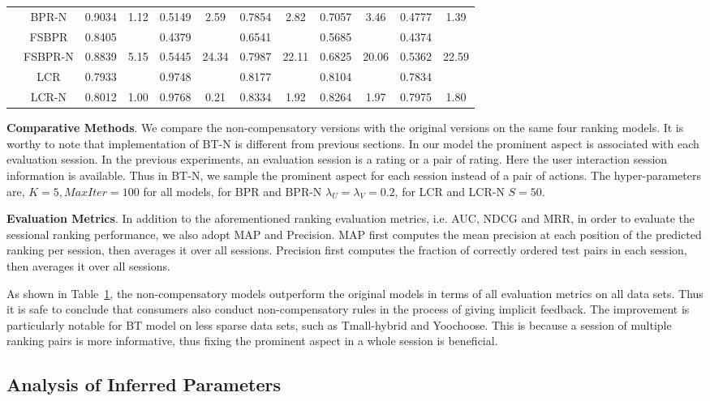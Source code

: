 \documentclass[letterpaper]{article} %
\begin{document}
\begin{table}[ht]
\begin{center}
\begin{tabular}{c|c |cc |cc |cc|cc|cc}
&BPR-N &0.9034 &1.12 &0.5149 & 2.59 &0.7854 &2.82 &0.7057 & 3.46 &0.4777  &1.39 \\
&FSBPR &0.8405& &0.4379 && 0.6541& &0.5685& & 0.4374 &\\ 
&FSBPR-N &0.8839 &5.15 & 0.5445 &24.34 &0.7987 &22.11 &0.6825 & 20.06 &0.5362  &22.59 \\
&LCR &0.7933& &0.9748 && 0.8177& &0.8104& & 0.7834 &\\ 
&LCR-N &0.8012 &1.00 & 0.9768 &0.21 &0.8334 &1.92 &0.8264 & 1.97 &0.7975  &1.80\\
	\hline
	\end{tabular}
\end{center}
\label{tab:gradedresult}
\end{table}%

\textbf{Comparative Methods}. We compare the non-compensatory versions with the original versions on the same four ranking models. It is worthy to note that implementation of BT-N is different from previous sections.  In our model the prominent aspect is associated with each evaluation session. In the previous experiments, an evaluation session is a rating or a pair of rating. Here the user interaction session information is available. Thus in BT-N, we sample the prominent aspect for each session instead of a pair of actions. The hyper-parameters are, $K=5, MaxIter=100$ for all models, for BPR and BPR-N $\lambda_U=\lambda_V=0.2$, for LCR and LCR-N $S=50$.  

\textbf{Evaluation Metrics}.  In addition to the aforementioned  ranking evaluation metrics, i.e. AUC, NDCG and MRR, in order to evaluate the sessional ranking performance, we also adopt  MAP and Precision. MAP first computes the mean precision at each position of the predicted ranking per session, then averages it over all sessions. Precision first computes the fraction of correctly ordered test pairs in each session, then averages it over all sessions. 

As shown in Table~\ref{tab:gradedresult}, the non-compensatory models outperform the original models in terms of all evaluation metrics on all data sets. Thus it is safe to conclude that consumers also conduct non-compensatory rules in the process of giving implicit feedback. The improvement is particularly notable for BT model on less sparse data sets, such as Tmall-hybrid and Yoochoose. This is because a session of multiple ranking pairs is more informative, thus fixing the prominent aspect in a whole session is beneficial.

\subsection{Analysis of Inferred Parameters}
\end{document}
